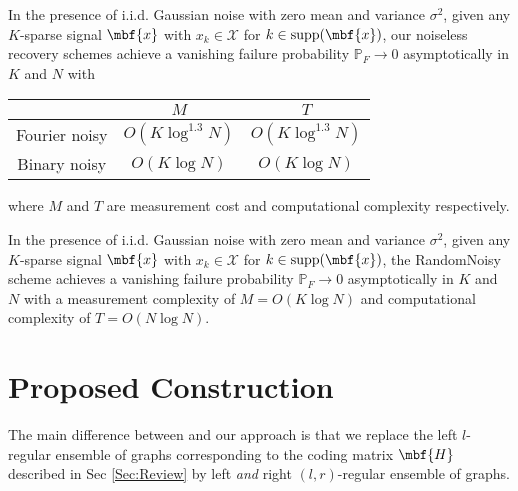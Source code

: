 \documentclass[conference]{IEEEtran}
\begin{document}
\begin{theorem}\label{thm:li2} In the presence of i.i.d. Gaussian noise with zero mean and
variance $\sigma^2$, given any $K$-sparse signal $\mbf{x}$ with $x_k \in \mathcal{X}$ for $k \in \text{supp}(\mbf{x})$, our noiseless recovery schemes achieve a vanishing failure probability $\mathbb{P}_F \rightarrow 0$ asymptotically in $K$ and $N$ with
\begin{center}\small
\begin{tabular}{|c|c|c|}
  \hline
   & $M$ &  $T$ \\
  \hline
  Fourier noisy & $O(K \log^{1.3}N)$ & $O(K \log^{1.3}N)$ \\
  \hline
  Binary noisy & $O(K \log N)$ & $O(K \log N)$ \\
  \hline
\end{tabular}
\end{center}
where $M$ and $T$ are measurement cost and computational complexity respectively.
\end{theorem}
\vspace{2ex}

\begin{theorem}\label{thm:li3} In the presence of i.i.d. Gaussian noise with zero mean and
variance $\sigma^2$, given any $K$-sparse signal $\mbf{x}$ with $x_k \in \mathcal{X}$ for $k \in \text{supp}(\mbf{x})$, the RandomNoisy scheme achieves a vanishing failure probability $\mathbb{P}_F \rightarrow 0$ asymptotically in $K$ and $N$ with a measurement complexity of $M = O(K \log N)$ and computational complexity of $T = O(N \log N)$.
\end{theorem}

\section{Proposed Construction}
The main difference between \cite{li2015subdraft} and our approach is that we replace the left $l$-regular ensemble of graphs corresponding to the coding matrix $\mbf{H}$ described in Sec \ref{Sec:Review} by left {\em and} right $\left(l, r\right)$-regular ensemble of graphs.
\end{document}
